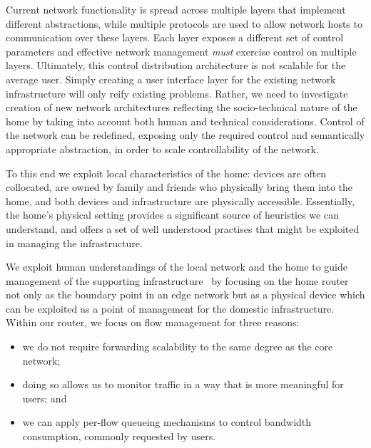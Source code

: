 Current network functionality is spread across multiple layers that implement
different abstractions, while multiple protocols are used to allow network hosts
to communication over these layers. Each layer exposes a different set of
control parameters and effective network management \emph{must} exercise control
on multiple layers. Ultimately, this control distribution architecture is not
scalable for the average user. Simply creating a user interface layer for the
existing network infrastructure will only reify existing problems.  Rather, we
need to investigate creation of new network architectures reflecting the
socio-technical nature of the home by taking into account both human and
technical considerations. Control of the network can be redefined, exposing only
the required control and semantically appropriate abstraction, in order to scale
controllability of the network.  

To this end we exploit local characteristics of the home: devices are often
collocated, are owned by family and friends who physically bring them into the
home, and both devices and infrastructure are physically accessible.
Essentially, the home's physical setting provides a significant source of
heuristics we can understand, and offers a set of well understood practises that
might be exploited in managing the infrastructure.  

We exploit human understandings of the local network and the home to guide
management of the supporting
infrastructure~\cite{crabtree03} by focusing on the
home router not only as the boundary point in an edge network but as a physical
device which can be exploited as a point of management for the domestic
infrastructure.  Within our router, we focus on flow management for three
reasons: 

\begin{itemize}
    \item we do not require forwarding scalability to the same degree as the
          core network; 
    \item doing so allows us to monitor traffic in a way that is more meaningful
          for users; and 
    \item we can apply per-flow queueing mechanisms to control bandwidth
          consumption, commonly requested by users.  
  \end{itemize}

